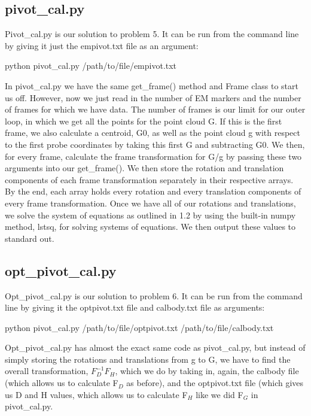 \documentclass[a4paper]{article}
\begin{document}
\subsection{pivot\_cal.py}
Pivot\_cal.py is our solution to problem 5. It can be run from the command line by giving it just the empivot.txt file as an argument: \break
\begin{center}
python pivot\_cal.py /path/to/file/empivot.txt \break
\end{center}
In pivot\_cal.py we have the same get\_frame() method and Frame class to start us off. However, now we just read in the number of EM markers and the number of frames for which we have data. The number of frames is our limit for our outer loop, in which we get all the points for the point cloud G. If this is the first frame, we also calculate a centroid, G0, as well as the point cloud g with respect to the first probe coordinates by taking this first G and subtracting G0. We then, for every frame, calculate the frame transformation for G/g by passing these two arguments into our get\_frame(). We then store the rotation and translation components of each frame transformation separately in their respective arrays. By the end, each array holds every rotation and every translation components of every frame transformation.
Once we have all of our rotations and translations, we solve the system of equations as outlined in 1.2 by using the built-in numpy method, lstsq, for solving systems of equations. We then output these values to standard out.

\subsection{opt\_pivot\_cal.py}
Opt\_pivot\_cal.py is our solution to problem 6. It can be run from the command line by giving it the optpivot.txt file and calbody.txt file as arguments: \break
\begin{center}
python pivot\_cal.py /path/to/file/optpivot.txt /path/to/file/calbody.txt\break
\end{center}
Opt\_pivot\_cal.py has almost the exact same code as pivot\_cal.py, but instead of simply storing the rotations and translations from g to G, we have to find the overall transformation, $F_D^{-1}F_H$, which we do by taking in, again, the calbody file (which allows us to calculate F$_D$ as before), and the optpivot.txt file (which gives us D and H values, which allows us to calculate F$_H$ like we did F$_G$ in pivot\_cal.py.
\end{document}
